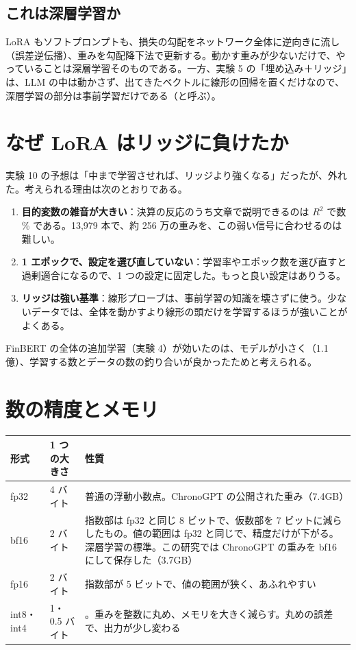 \subsection{これは深層学習か}

LoRA もソフトプロンプトも、損失の勾配をネットワーク全体に逆向きに流し（誤差逆伝播）、重みを勾配降下法で更新する。動かす重みが少ないだけで、やっていることは深層学習そのものである。一方、実験 5 の「埋め込み＋リッジ」は、LLM の中は動かさず、出てきたベクトルに線形の回帰を置くだけなので、深層学習の部分は事前学習だけである（と呼ぶ）。

\section{なぜ LoRA はリッジに負けたか}

実験 10 の予想は「中まで学習させれば、リッジより強くなる」だったが、外れた。考えられる理由は次のとおりである。

\begin{enumerate}
\item \textbf{目的変数の雑音が大きい}：決算の反応のうち文章で説明できるのは $R^2$ で数 \% である。13,979 本で、約 256 万の重みを、この弱い信号に合わせるのは難しい。
\item \textbf{1 エポックで、設定を選び直していない}：学習率やエポック数を選び直すと過剰適合になるので、1 つの設定に固定した。もっと良い設定はありうる。
\item \textbf{リッジは強い基準}：線形プローブは、事前学習の知識を壊さずに使う。少ないデータでは、全体を動かすより線形の頭だけを学習するほうが強いことがよくある。
\end{enumerate}

FinBERT の全体の追加学習（実験 4）が効いたのは、モデルが小さく（1.1 億）、学習する数とデータの数の釣り合いが良かったためと考えられる。

\section{数の精度とメモリ}

\begin{longtable}{P{2.4cm}P{2.0cm}P{10.0cm}}
\toprule
\textbf{形式} & \textbf{1 つの大きさ} & \textbf{性質} \\
\midrule
\endhead
\bottomrule
\endfoot
fp32 & 4 バイト & 普通の浮動小数点。ChronoGPT の公開された重み（7.4GB） \\
bf16 & 2 バイト & 指数部は fp32 と同じ 8 ビットで、仮数部を 7 ビットに減らしたもの。値の範囲は fp32 と同じで、精度だけが下がる。深層学習の標準。この研究では ChronoGPT の重みを bf16 にして保存した（3.7GB） \\
fp16 & 2 バイト & 指数部が 5 ビットで、値の範囲が狭く、あふれやすい \\
int8・int4 & 1・0.5 バイト & 。重みを整数に丸め、メモリを大きく減らす。丸めの誤差で、出力が少し変わる \\
\end{longtable}

